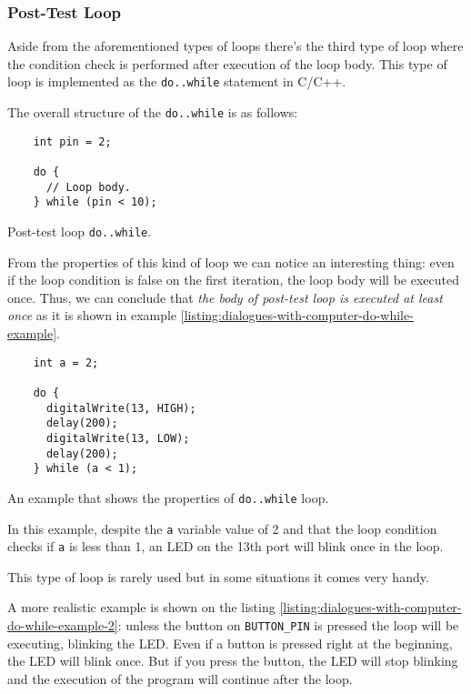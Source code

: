 \documentclass[../sparc.tex]{subfiles}
\begin{document}
\subsubsection{Post-Test Loop}

Aside from the aforementioned types of loops there's the third type of loop
where the condition check is performed after execution of the loop body.  This
type of loop is implemented as the \texttt{do..while} statement in C/C++.

The overall structure of the \texttt{do..while} is as follows:

\begin{listing}[ht]
  \begin{verbatim}
    int pin = 2;

    do {
      // Loop body.
    } while (pin < 10);
  \end{verbatim}
  \label{listing:dialogues-with-computer-do-while}
  \caption{Post-test loop \texttt{do..while}.}
\end{listing}

From the properties of this kind of loop we can notice an interesting thing:
even if the loop condition is false on the first iteration, the loop body will
be executed once.  Thus, we can conclude that \emph{the body of post-test loop
is executed at least once} as it is shown in example
\ref{listing:dialogues-with-computer-do-while-example}.

\begin{listing}[ht]
  \begin{verbatim}
    int a = 2;

    do {
      digitalWrite(13, HIGH);
      delay(200);
      digitalWrite(13, LOW);
      delay(200);
    } while (a < 1);
  \end{verbatim}
  \label{listing:dialogues-with-computer-do-while-example}
  \caption{An example that shows the properties of \texttt{do..while} loop.}
\end{listing}

In this example, despite the \texttt{a} variable value of 2 and that the loop
condition checks if \texttt{a} is less than 1, an LED on the 13th port will
blink once in the loop.

This type of loop is rarely used but in some situations it comes very handy.

A more realistic example is shown on the listing
\ref{listing:dialogues-with-computer-do-while-example-2}: unless the button on
\texttt{BUTTON\_PIN} is pressed the loop will be executing, blinking the LED.
Even if a button is pressed right at the beginning, the LED will blink once.
But if you press the button, the LED will stop blinking and the execution of the
program will continue after the loop.
\end{document}
